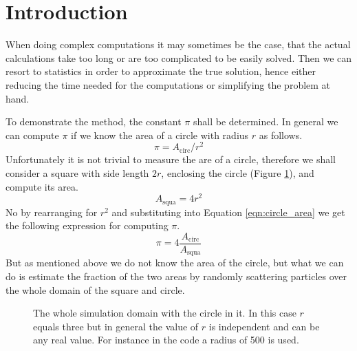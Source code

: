 \documentclass{aa}
\begin{document}
\section{Introduction}%
\label{sec:introduction}

When doing complex computations it may sometimes be the case, that the actual
calculations take too long or are too complicated to be easily solved. Then we can resort to
statistics in order to approximate the true solution, hence either reducing the time needed for
the computations or simplifying the problem at hand.

To demonstrate the method, the constant \(\pi\) shall be determined. In general we can compute
\(\pi\) if we know the area of a circle with radius \(r\) as follows.
\begin{equation}
    \label{eqn:circle_area}
    \pi = A_\mathrm{circ} / r^2
\end{equation}
Unfortunately it is not trivial to measure the are of a circle, therefore we shall consider a
square with side length \(2r\), enclosing the circle (Figure \ref{fig:domain}), and compute its
area.
\begin{equation}
    \label{eqn:area_square}
    A_\mathrm{squa} = 4r^2
\end{equation}
No by rearranging for \(r^2\) and substituting into Equation \ref{eqn:circle_area} we get the
following expression for computing \(\pi\).
\begin{equation}
    \label{eqn:pi}
    \pi = 4 \frac{A_\mathrm{circ}}{A_\mathrm{squa}}
\end{equation}
But as mentioned above we do not know the area of the circle, but what we can do is estimate
the fraction of the two areas by randomly scattering particles over the whole domain of the
square and circle.
\begin{figure}[htbp]
    \centering
    \captionsetup{width = 0.9 \linewidth}
    \caption{The whole simulation domain with the circle in it. In this case \(r\) equals three
    but in general the value of \(r\) is independent and can be any real value. For instance in
    the code a radius of 500 is used.}
    \label{fig:domain}
\end{figure}
\end{document}
